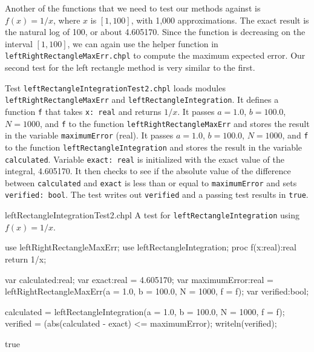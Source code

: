 Another of the functions that we need to test our methods against is 
$f(x) = 1/x$, where $x$ is $[1,100]$, with 1,000 approximations. 
The exact result is the natural log of 100, or about 4.605170.
Since the function is decreasing on the interval $[1,100]$, we can again use 
the helper function in \lstinline{leftRightRectangleMaxErr.chpl} to compute the 
maximum expected error.  
Our second test 
for the left rectangle method is very similar to the first. 
\begin{enumspec}
\item{}
Test \lstinline{leftRectangleIntegrationTest2.chpl} loads modules
\lstinline{leftRightRectangleMaxErr} and
\lstinline{leftRectangleIntegration}.
It defines a function \lstinline{f} that takes \lstinline{x: real} and returns $1/x$.
It passes $a=1.0$, $b=100.0$, $N=1000$, and \lstinline{f} to the function
\lstinline{leftRightRectangleMaxErr} and stores the result in the variable
\lstinline{maximumError} (real).
It passes $a=1.0$, $b=100.0$, $N=1000$, and \lstinline{f} to the function
\lstinline{leftRectangleIntegration} and stores the result in the variable
\lstinline{calculated}.
Variable \lstinline{exact: real} is initialized with the exact value of the integral, 4.605170.
It then checks to see if the absolute value of the difference between \lstinline{calculated} 
and \lstinline{exact} is less than or equal to \lstinline{maximumError} and sets 
\lstinline{verified: bool}. The test writes out \lstinline{verified} and a passing
test results in \lstinline{true}.
\end{enumspec}

\begin{chapelexample}{leftRectangleIntegrationTest2.chpl}
  A test for \lstinline{leftRectangleIntegration} using $f(x) = 1/x$.
\begin{chapelpre}
\end{chapelpre}
\begin{chapel}
use leftRightRectangleMaxErr;
use leftRectangleIntegration;
proc f(x:real):real {
  return 1/x;
} 
  
var calculated:real;
var exact:real = 4.605170; 
var maximumError:real = leftRightRectangleMaxErr(a = 1.0, b = 100.0, N = 1000, f = f);
var verified:bool;

calculated = leftRectangleIntegration(a = 1.0, b = 100.0, N = 1000, f = f);
verified = (abs(calculated - exact) <= maximumError);
writeln(verified);
\end{chapel}
\begin{chapelpost}
\end{chapelpost}
\begin{chapeloutput}
true
\end{chapeloutput}
\end{chapelexample}

